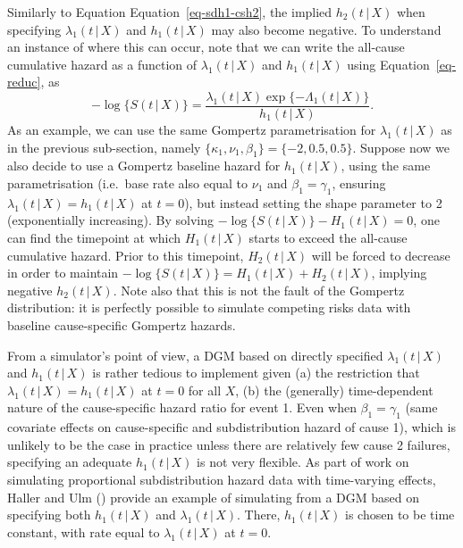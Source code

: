 \documentclass[
  letterpaper,
  DIV=11,
  numbers=noendperiod]{scrreprt}
\newcommand{\given}{\,|\,}
\begin{document}
Similarly to Equation Equation~\ref{eq-sdh1-csh2}, the implied
\(h_2(t \given X)\) when specifying \(\lambda_1(t \given X)\) and
\(h_1(t \given X)\) may also become negative. To understand an instance
of where this can occur, note that we can write the all-cause cumulative
hazard as a function of \(\lambda_1(t \given X)\) and
\(h_1(t \given X)\) using Equation~\ref{eq-reduc}, as \begin{equation*}
    -\log\{S(t \given X)\} = \frac{\lambda_1(t \given X) \exp\{-\Lambda_1(t \given X)\}}{h_1(t \given X)}.
\end{equation*} As an example, we can use the same Gompertz
parametrisation for \(\lambda_1(t \given X)\) as in the previous
sub-section, namely \(\{\kappa_1, \nu_1, \beta_1\} = \{-2, 0.5, 0.5\}\).
Suppose now we also decide to use a Gompertz baseline hazard for
\(h_1(t \given X)\), using the same parametrisation (i.e.~base rate also
equal to \(\nu_1\) and \(\beta_1 = \gamma_1\), ensuring
\(\lambda_1(t \given X) = h_1(t \given X)\) at \(t = 0\)), but instead
setting the shape parameter to 2 (exponentially increasing). By solving
\(-\log\{S(t \given X)\} - H_1(t \given X) = 0\), one can find the
timepoint at which \(H_1(t \given X)\) starts to exceed the all-cause
cumulative hazard. Prior to this timepoint, \(H_2(t \given X)\) will be
forced to decrease in order to maintain
\(-\log\{S(t \given X)\} = H_1(t \given X) + H_2(t \given X)\), implying
negative \(h_2(t \given X)\). Note also that this is not the fault of
the Gompertz distribution: it is perfectly possible to simulate
competing risks data with baseline cause-specific Gompertz hazards.

From a simulator's point of view, a DGM based on directly specified
\(\lambda_1(t \given X)\) and \(h_1(t \given X)\) is rather tedious to
implement given (a) the restriction that
\(\lambda_1(t \given X) = h_1(t \given X)\) at \(t = 0\) for all \(X\),
(b) the (generally) time-dependent nature of the cause-specific hazard
ratio for event 1. Even when \(\beta_1 = \gamma_1\) (same covariate
effects on cause-specific and subdistribution hazard of cause 1), which
is unlikely to be the case in practice unless there are relatively few
cause 2 failures, specifying an adequate \(h_1(t \given X)\) is not very
flexible. As part of work on simulating proportional subdistribution
hazard data with time-varying effects, Haller and Ulm
() provide an
example of simulating from a DGM based on specifying both
\(h_1(t \given X)\) and \(\lambda_1(t \given X)\). There,
\(h_1(t \given X)\) is chosen to be time constant, with rate equal to
\(\lambda_1(t \given X)\) at \(t = 0\).
\end{document}
